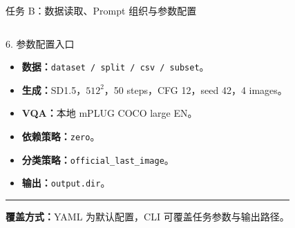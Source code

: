 \documentclass[aspectratio=169,10pt]{beamer}
\begin{document}
\begin{frame}{任务 B：数据读取、Prompt 组织与参数配置}
\begin{columns}[T,onlytextwidth]
      \begin{block}{6. 参数配置入口}
        \begin{minipage}[c][5.05cm][c]{\linewidth}
          \begin{itemize}\scriptsize
            \item \textbf{数据：}\texttt{dataset / split / csv / subset}。
            \item \textbf{生成：}SD1.5，$512^2$，50 steps，CFG 12，seed 42，4 images。
            \item \textbf{VQA：}本地 mPLUG COCO large EN。
            \item \textbf{依赖策略：}\texttt{zero}。
            \item \textbf{分类策略：}\texttt{official\_last\_image}。
            \item \textbf{输出：}\texttt{output.dir}。
          \end{itemize}
          \vspace{0.45em}
          \color{T2IGray}\rule{\linewidth}{0.35pt}\par\vspace{0.3em}
          \scriptsize\textbf{覆盖方式：}YAML 为默认配置，CLI 可覆盖任务参数与输出路径。
        \end{minipage}
      \end{block}
  \end{columns}
\end{frame}
\end{document}
